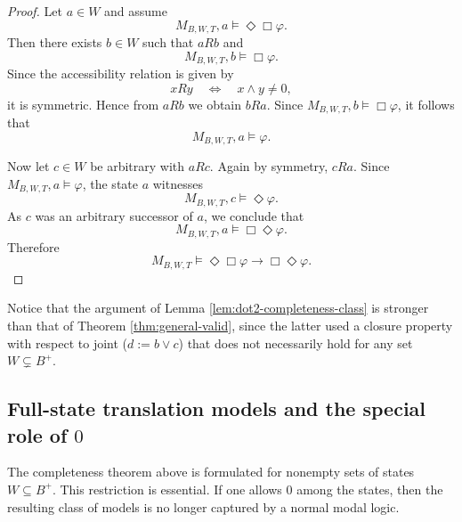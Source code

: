 \documentclass[11pt]{amsart}
\theoremstyle{definition}
\theoremstyle{plain}
\begin{document}
\begin{proof}
Let $a\in W$ and assume
\[
M_{B,W,T},a\models \Diamond\Box\varphi.
\]
Then there exists $b\in W$ such that $aRb$ and
\[
M_{B,W,T},b\models \Box\varphi.
\]
Since the accessibility relation is given by
\[
xRy \quad\Longleftrightarrow\quad x\wedge y\neq 0,
\]
it is symmetric. Hence from $aRb$ we obtain $bRa$. Since $M_{B,W,T},b\models \Box\varphi$, it follows that
\[
M_{B,W,T},a\models \varphi.
\]

Now let $c\in W$ be arbitrary with $aRc$. Again by symmetry, $cRa$. Since
$M_{B,W,T},a\models \varphi$, the state $a$ witnesses
\[
M_{B,W,T},c\models \Diamond\varphi.
\]
As $c$ was an arbitrary successor of $a$, we conclude that
\[
M_{B,W,T},a\models \Box\Diamond\varphi.
\]
Therefore
\[
M_{B,W,T}\models \Diamond\Box\varphi \to \Box\Diamond\varphi.
\]
\end{proof}


Notice  that the argument of Lemma \ref{lem:dot2-completeness-class} is stronger than that of Theorem \ref{thm:general-valid}, since the latter used  a closure property with respect to joint ($d:=b\vee c$) that does not necessarily hold for any set $W \subsetneq B^+$.








\subsection{Full-state translation models and the special role of $0$}\label{subsec:full-state-characterization}

The completeness theorem above is formulated for nonempty sets of states $W\subseteq B^+$.
This restriction is essential. If one allows $0$ among the states, then the resulting class of
models is no longer captured by a normal modal logic.
\end{document}
